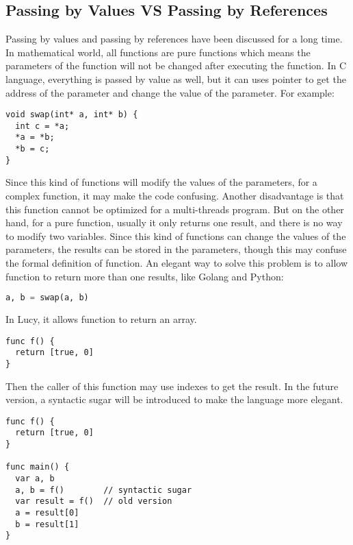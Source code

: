 \subsection{Passing by Values VS Passing by References}
Passing by values and passing by references have been discussed for a long time. In mathematical world, all functions are pure functions which means the parameters of the function will not be changed after executing the function. In C language, everything is passed by value as well, but it can uses pointer to get the address of the parameter and change the value of the parameter. For example:
\begin{lstlisting}
void swap(int* a, int* b) {
  int c = *a;
  *a = *b;
  *b = c;
}
\end{lstlisting}
Since this kind of functions will modify the values of the parameters, for a complex function, it may make the code confusing. Another disadvantage is that this function cannot be optimized for a multi-threads program. But on the other hand, for a pure function, usually it only returns one result, and there is no way to modify two variables. Since this kind of functions can change the values of the parameters, the results can be stored in the parameters, though this may confuse the formal definition of function. An elegant way to solve this problem is to allow function to return more than one results, like Golang and Python:
\begin{lstlisting}[language=python]
a, b = swap(a, b)
\end{lstlisting}
In Lucy, it allows function to return an array.
\begin{lstlisting}
func f() {
  return [true, 0]
}
\end{lstlisting}
Then the caller of this function may use indexes to get the result. In the future version, a syntactic sugar will be introduced to make the language more elegant.
\begin{lstlisting}
func f() {
  return [true, 0]
}

func main() {
  var a, b
  a, b = f()        // syntactic sugar
  var result = f()  // old version
  a = result[0]
  b = result[1]
}
\end{lstlisting}


